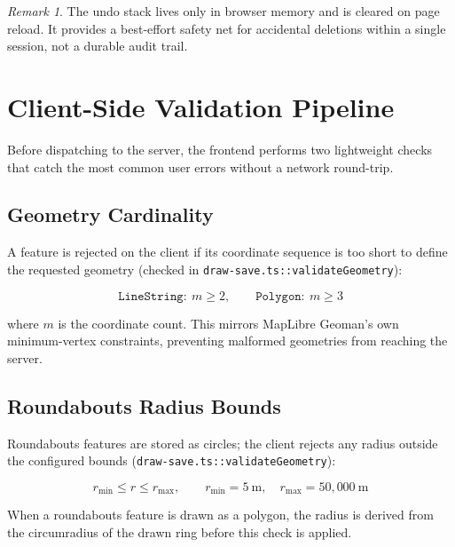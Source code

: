 \documentclass[12pt,a4paper]{article}
\theoremstyle{definition}
\theoremstyle{plain}
\theoremstyle{remark}
\newtheorem{remark}{Remark}[section]
\begin{document}
\begin{remark}
The undo stack lives only in browser memory and is cleared on page reload.
It provides a best-effort safety net for accidental deletions within a
single session, not a durable audit trail.
\end{remark}

\section{Client-Side Validation Pipeline}
\label{sec:client_validation}

Before dispatching to the server, the frontend performs two lightweight
checks that catch the most common user errors without a network round-trip.

\subsection{Geometry Cardinality}

A feature is rejected on the client if its coordinate sequence is too
short to define the requested geometry (checked in
\texttt{draw-save.ts::validateGeometry}):

\begin{equation}
  \texttt{LineString}: \ m \geq 2, \qquad
  \texttt{Polygon}: \ m \geq 3
  \label{eq:min_cardinality}
\end{equation}

where $m$ is the coordinate count. This mirrors MapLibre Geoman's own
minimum-vertex constraints, preventing malformed geometries from reaching
the server.

\subsection{Roundabouts Radius Bounds}

Roundabouts features are stored as circles; the client rejects any radius
outside the configured bounds (\texttt{draw-save.ts::validateGeometry}):

\begin{equation}
  r_{\min} \leq r \leq r_{\max}, \qquad
  r_{\min} = 5\ \mathrm{m}, \quad r_{\max} = 50{,}000\ \mathrm{m}
  \label{eq:roundabouts_radius_bounds}
\end{equation}

When a roundabouts feature is drawn as a polygon, the radius is derived from the
circumradius of the drawn ring before this check is applied.
\end{document}
